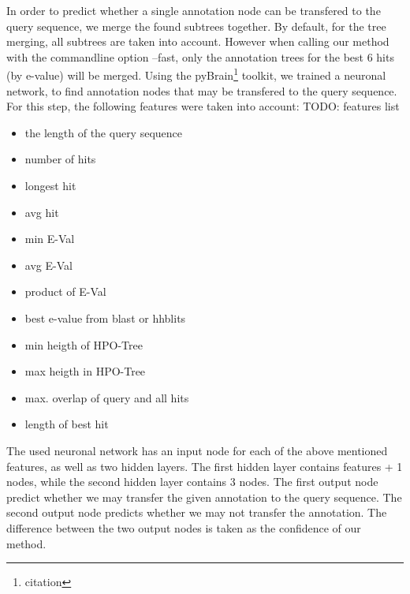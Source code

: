 In order to predict whether a single annotation node can be transfered to the query sequence, we merge the found subtrees together. By default, for the tree merging, all subtrees are taken into account.
However when calling our method with the commandline option --fast, only the annotation trees for the best 6 hits (by e-value) will be merged.\newline
Using the pyBrain\footnote{citation} toolkit, we trained a neuronal network, to find annotation nodes that may be transfered to the query sequence. For this step, the following features were taken into
account:\newline
TODO: features list\newline
\begin{itemize}
\item the length of the query sequence
\item number of hits
\item longest hit
\item avg hit
\item min E-Val
\item avg E-Val
\item product of E-Val
\item best e-value from blast or hhblits
\item min heigth of HPO-Tree
\item max heigth in HPO-Tree
\item max. overlap of query and all hits
\item length of best hit
\end{itemize}
The used neuronal network has an input node for each of the above mentioned features, as well as two
hidden layers. The first hidden layer contains features + 1 nodes, while the second hidden layer
contains 3 nodes. The first output node predict whether we may transfer the given annotation to the 
query sequence. The second output node predicts whether we may not transfer the annotation.
The difference between the two output nodes is taken as the confidence of our method.
